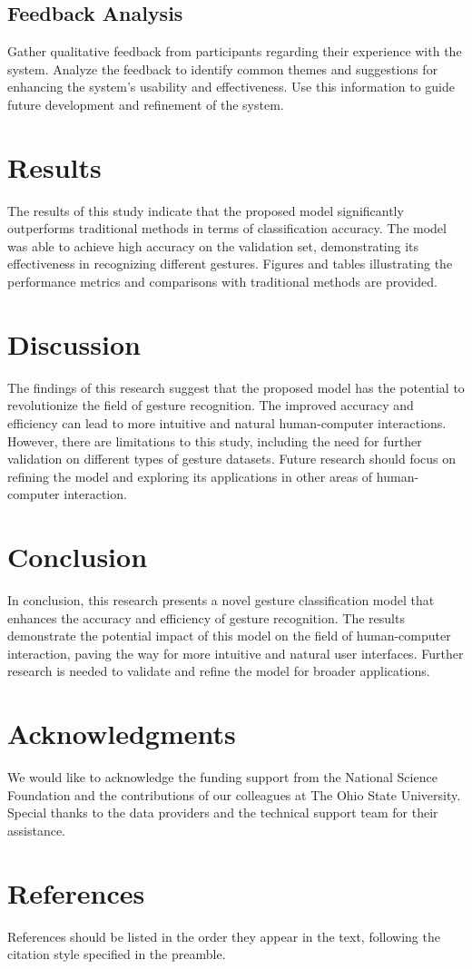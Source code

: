 \documentclass{article}
\begin{document}
\subsection{Feedback Analysis}
Gather qualitative feedback from participants regarding their experience with the system. Analyze the feedback to identify common themes and suggestions for enhancing the system's usability and effectiveness. Use this information to guide future development and refinement of the system.
\section{Results}
The results of this study indicate that the proposed model significantly outperforms traditional methods in terms of classification accuracy. The model was able to achieve high accuracy on the validation set, demonstrating its effectiveness in recognizing different gestures. Figures and tables illustrating the performance metrics and comparisons with traditional methods are provided.

\section{Discussion}
The findings of this research suggest that the proposed model has the potential to revolutionize the field of gesture recognition. The improved accuracy and efficiency can lead to more intuitive and natural human-computer interactions. However, there are limitations to this study, including the need for further validation on different types of gesture datasets. Future research should focus on refining the model and exploring its applications in other areas of human-computer interaction.

\section{Conclusion}
In conclusion, this research presents a novel gesture classification model that enhances the accuracy and efficiency of gesture recognition. The results demonstrate the potential impact of this model on the field of human-computer interaction, paving the way for more intuitive and natural user interfaces. Further research is needed to validate and refine the model for broader applications.

\section*{Acknowledgments}
We would like to acknowledge the funding support from the National Science Foundation and the contributions of our colleagues at The Ohio State University. Special thanks to the data providers and the technical support team for their assistance.

\section*{References}
References should be listed in the order they appear in the text, following the citation style specified in the preamble.
\printbibliography
\end{document}
